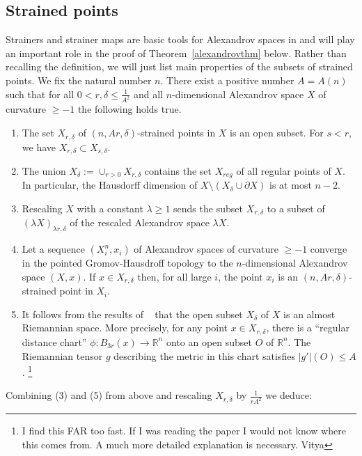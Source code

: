 \documentclass[12pt,leqno]{amsart}
\numberwithin{equation}{section}
\theoremstyle{definition}
\theoremstyle{remark}
\newcommand{\tref}[1]{Theorem~\ref{#1}}
\newcommand{\R}{\mathbb{R}}
\begin{document}
\subsection{Strained points}    Strainers and strainer maps are basic tools for Alexandrov spaces in \cite{BGP} and will play an important role in the proof of \tref{alexandrovthm} below. Rather than recalling the definition, we will just list main properties of the subsets of strained points.  We fix the natural number $n$.
There exist a positive number $A=A(n)$ such that for   all $0<r,\delta \leq  \frac 1 {A^2}$ and all $n$-dimensional Alexandrov space $X$ of curvature $\geq -1$ the following holds true.
\begin{enumerate}
\item The set $X_{r,\delta}$ of $(n,Ar, \delta)$-strained points in $X$ is an open subset.  For $s<r$, we have $X_{r,\delta} \subset X_{s,\delta}$.
\item The union $X_{\delta}:= \cup _{r>0}  X_{r,\delta}$ contains the set $X_{reg}$ of all regular points of $X$. In particular, the Hausdorff dimension of $X\setminus (X_{\delta} \cup \partial X)$ is at most $n-2$.
\item Rescaling $X$ with a constant $\lambda \geq 1$ sends the subset $X_{r,\delta}$ to a subset of $(\lambda X )_{\lambda r, \delta} $ of the rescaled Alexandrov space $\lambda X$.
\item Let a sequence    $(X_i ^n,x_i)$ of Alexandrov spaces  of curvature $\geq -1$ converge in the pointed Gromov-Hausdroff topology to the $n$-dimensional Alexandrov space $(X,x)$.
If $x\in X_{r,\delta}$ then, for all large $i$, the point $x_i$ is an   $(n,Ar, \delta)$-strained point in $X_i$.
\item It follows from the results of ~\cite{Per-DC} that the open subset $X_{\delta}$ of $X$ is an almost Riemannian space.
 More precisely, for any point $x\in X_{r,\delta}$, there is a ``regular distance chart'' $\phi:B_{3r} (x)\to \R^n$ onto an open subset $O$ of $\R^n$. The Riemannian tensor $g$   describing the
metric in this chart  satisfies $|g'| (O) \leq A$. \footnote{\color{red} I find this FAR too fast. If I was reading the paper I would not know where this comes from. A much more detailed explanation is necessary.  Vitya}

\end{enumerate}


Combining (3) and (5) from above and rescaling $X_{r,\delta}$  by $\frac 1 {r A^2} $  we
 deduce:
\end{document}
